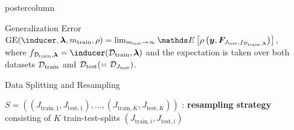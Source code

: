 \documentclass{beamer}
\begin{document}
\begin{frame}[fragile]{}
\begin{columns}
\begin{column}{.31\textwidth}
\begin{beamercolorbox}[center]{postercolumn}
\begin{minipage}{.98\textwidth}
{\begin{myblock}{Generalization Error}
 $\mathrm{GE}(\inducer, \bm{\lambda}, m_{\mathrm{train}}, \rho) = \lim_{m_{\mathrm{test}}\rightarrow\infty} \E \left[ \rho\left(\boldsymbol{y}, \boldsymbol{F}_{J_{\mathrm{test}},f_{\mathcal{D}_{\mathrm{train}}, \bm{\lambda}}}\right)\right],$ \\
 
where $f_{\mathcal{D}_{\mathrm{train}}, \bm{\lambda}} = \inducer(\mathcal{D}_{\mathrm{train}}, \bm{\lambda})$ and the expectation is taken over both datasets $\mathcal{D}_{\text{train}}$ and $\mathcal{D}_{\text{test}} (= \mathcal{D}_{J_\mathrm{test}})$.
\end{myblock}

\begin{myblock}{Data Splitting and Resampling}

$S = \left((J_{\mathrm{train},1}, J_{\mathrm{test},1}),\dots,
(J_{\mathrm{train},K}, J_{\mathrm{test},K})\right)$ : \textbf{resampling strategy} consisting of $K$ train-test-splits $(J_{\mathrm{train},i}, J_{\mathrm{test},i})$\\


\end{myblock}}
\end{minipage}
\end{beamercolorbox}
\end{column}
\end{columns}
\end{frame}
\end{document}
